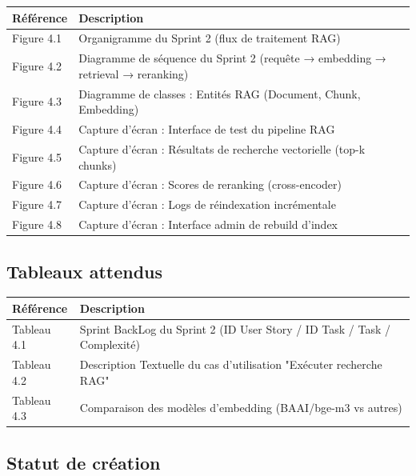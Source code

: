 \documentclass[12pt,a4paper]{article}
\begin{document}
\begin{longtable}{p{2cm} p{12cm}}
    \textbf{Référence} & \textbf{Description} \\
    \midrule
    \endhead
    
    Figure 4.1 & Organigramme du Sprint 2 (flux de traitement RAG) \\
    Figure 4.2 & Diagramme de séquence du Sprint 2 (requête → embedding → retrieval → reranking) \\
    Figure 4.3 & Diagramme de classes : Entités RAG (Document, Chunk, Embedding) \\
    Figure 4.4 & Capture d'écran : Interface de test du pipeline RAG \\
    Figure 4.5 & Capture d'écran : Résultats de recherche vectorielle (top-k chunks) \\
    Figure 4.6 & Capture d'écran : Scores de reranking (cross-encoder) \\
    Figure 4.7 & Capture d'écran : Logs de réindexation incrémentale \\
    Figure 4.8 & Capture d'écran : Interface admin de rebuild d'index \\
    \bottomrule
\end{longtable}

\subsection*{Tableaux attendus}

\begin{longtable}{p{2cm} p{12cm}}
    \textbf{Référence} & \textbf{Description} \\
    \midrule
    \endhead
    
    Tableau 4.1 & Sprint BackLog du Sprint 2 (ID User Story / ID Task / Task / Complexité) \\
    Tableau 4.2 & Description Textuelle du cas d'utilisation "Exécuter recherche RAG" \\
    Tableau 4.3 & Comparaison des modèles d'embedding (BAAI/bge-m3 vs autres) \\
    \bottomrule
\end{longtable}

\subsection*{Statut de création}
\end{document}
